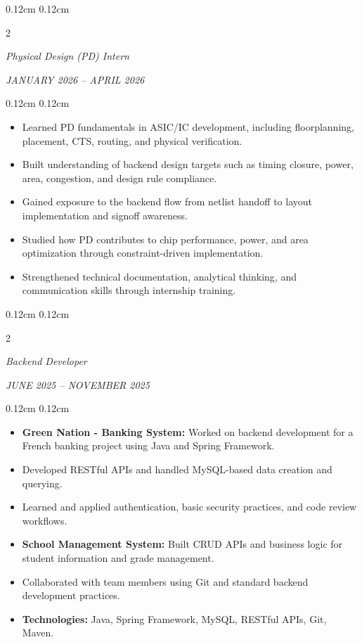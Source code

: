 \documentclass[10pt, letterpaper]{article}
\newenvironment{highlights}{
    \begin{itemize}[
        topsep=0.08cm,
        parsep=0.04cm,
        partopsep=0pt,
        itemsep=0.05cm,
        leftmargin=0.36cm + 10pt 
    ]
}{
    \end{itemize}
}
\newenvironment{onecolentry}{
    \begin{adjustwidth}{
        0.12cm 
    }{
        0.12cm
    }
}{
    \end{adjustwidth}
}
\newenvironment{twocolentry}[2][]{ 
    \onecolentry
    \def\secondColumnText{#2}
    \setcolumnwidth{\fill, 5.0cm} 
    \begin{paracol}{2}
    \ifblank{#1}{}{\textbf{#1}\\}%
}{
    \switchcolumn \raggedleft \textit{\secondColumnText} 
    \end{paracol}
    \endonecolentry
}
\begin{document}
\begin{twocolentry}[Skyechip]{JANUARY 2026 -- APRIL 2026}
    \textit{Physical Design (PD) Intern}
\end{twocolentry}
\begin{onecolentry}
    \begin{highlights}
        \item Learned PD fundamentals in ASIC/IC development, including floorplanning, placement, CTS, routing, and physical verification.
        \item Built understanding of backend design targets such as timing closure, power, area, congestion, and design rule compliance.
        \item Gained exposure to the backend flow from netlist handoff to layout implementation and signoff awareness.
        \item Studied how PD contributes to chip performance, power, and area optimization through constraint-driven implementation.
        \item Strengthened technical documentation, analytical thinking, and communication skills through internship training.
    \end{highlights}
\end{onecolentry}
\vspace{0.12cm}

\begin{twocolentry}[DigiEx]{JUNE 2025 -- NOVEMBER 2025}
    \textit{Backend Developer}
\end{twocolentry}
\begin{onecolentry}
    \begin{highlights}
        \item \textbf{Green Nation - Banking System:} Worked on backend development for a French banking project using Java and Spring Framework.
        \item Developed RESTful APIs and handled MySQL-based data creation and querying.
        \item Learned and applied authentication, basic security practices, and code review workflows.
        \item \textbf{School Management System:} Built CRUD APIs and business logic for student information and grade management.
        \item Collaborated with team members using Git and standard backend development practices.
        \item \textbf{Technologies:} Java, Spring Framework, MySQL, RESTful APIs, Git, Maven.
    \end{highlights}
\end{onecolentry}
\vspace{0.12cm}
\end{document}
